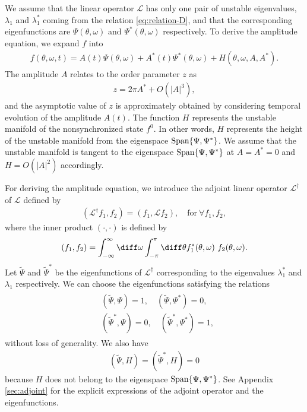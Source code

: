 We assume that the linear operator $\mathcal{L}$
has only one pair of unstable eigenvalues,
$\lambda_{1}$ and $\lambda_{1}^{\ast}$
coming from the relation \eqref{eq:relation-D},
and that the corresponding eigenfunctions are
$\Psi(\theta,\omega)$ and $\Psi^{\ast}(\theta,\omega)$ respectively.
To derive the amplitude equation, we expand $f$ into
\begin{align}
  f(\theta,\omega,t) = A(t) \Psi(\theta,\omega)
  + A^{\ast}(t) \Psi^{\ast}(\theta,\omega) + H(\theta,\omega, A, A^{\ast}).
  \label{eq:expand-f}
\end{align}
The amplitude $A$ relates to the order parameter $z$ as
\begin{align}
  z = 2\pi A^{\ast} + O(|A|^{3}),
\end{align}
and the asymptotic value of $z$ is approximately obtained by considering
temporal evolution of the amplitude $A(t)$.
The function $H$ represents the unstable manifold of
the nonsynchronized state $f^{0}$.
In other words, $H$ represents the height of the unstable manifold
from the eigenspace ${\rm Span}\{\Psi,\Psi^{\ast}\}$.
We assume that the unstable manifold is tangent
to the eigenspace ${\rm Span}\{\Psi,\Psi^{\ast}\}$
at $A=A^{\ast}=0$ and $H=O(|A|^{2})$ accordingly.

For deriving the amplitude equation,
we introduce the adjoint linear operator $\mathcal{L}^{\dagger}$ of $\mathcal{L}$
defined by
\begin{align}
  \left( \mathcal{L}^{\dagger} f_{1}, f_{2} \right)
  = \left( f_{1}, \mathcal{L} f_{2} \right),
  \quad
  \mathrm{ for }~\forall f_{1},f_{2},
\end{align}
where the inner product $(\cdot,\cdot)$ is defined by
\begin{align}
  \left( f_{1}, f_{2} \right)
  = \int_{-\infty}^{\infty} \diff\omega \int_{-\pi}^{\pi} \diff\theta
  f_{1}^{\ast}(\theta,\omega) ~ f_{2}(\theta,\omega).
\end{align}
Let $\widetilde{\Psi}$ and $\widetilde{\Psi}^{\ast}$
be the eigenfunctions of $\mathcal{L}^{\dagger}$
corresponding to the eigenvalues
$\lambda_{1}^{\ast}$ and $\lambda_{1}$ respectively.
We can choose the eigenfunctions satisfying the relations
\begin{align}
  \label{eq:normalization-tildePsi}
  \begin{aligned}
    & \left( \widetilde{\Psi}, \Psi \right) = 1,
     \quad
     \left( \widetilde{\Psi}, \Psi^{\ast} \right) = 0, \\
     & \left( \widetilde{\Psi}^{\ast}, \Psi \right) = 0,
     \quad
     \left( \widetilde{\Psi}^{\ast}, \Psi^{\ast} \right) = 1,
  \end{aligned}
\end{align}
without loss of generality. We also have
\begin{align}
  \left( \widetilde{\Psi}, H \right)
  = \left( \widetilde{\Psi}^{\ast}, H \right)
  = 0
  \label{eq:orthogonality-Psi-H}
\end{align}
because $H$ does not belong to the eigenspace ${\rm Span}\{\Psi,\Psi^{\ast}\}$.
See Appendix \ref{sec:adjoint} for the explicit expressions
of the adjoint operator and the eigenfunctions.

